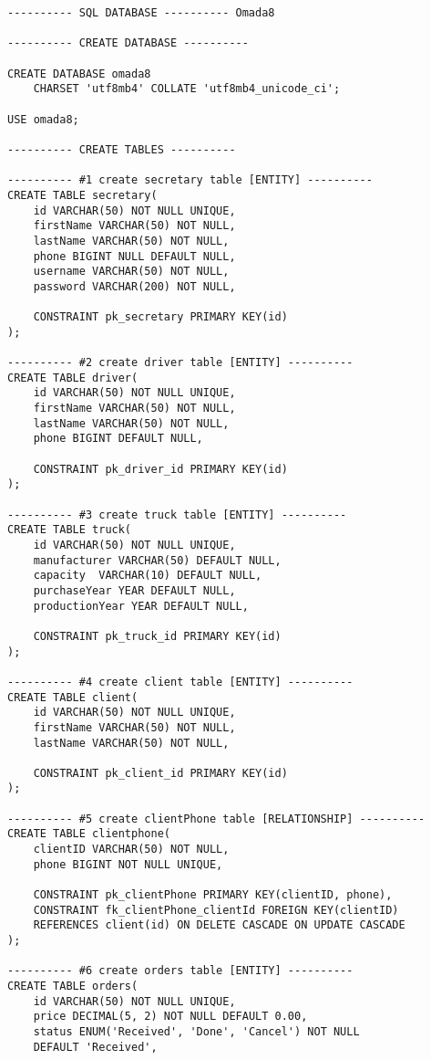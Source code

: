 \begin{lstlisting}
---------- SQL DATABASE ---------- Omada8

---------- CREATE DATABASE ----------

CREATE DATABASE omada8
	CHARSET 'utf8mb4' COLLATE 'utf8mb4_unicode_ci';

USE omada8;

---------- CREATE TABLES ----------

---------- #1 create secretary table [ENTITY] ----------
CREATE TABLE secretary(
    id VARCHAR(50) NOT NULL UNIQUE,
    firstName VARCHAR(50) NOT NULL,
    lastName VARCHAR(50) NOT NULL,
    phone BIGINT NULL DEFAULT NULL,
    username VARCHAR(50) NOT NULL,
    password VARCHAR(200) NOT NULL,
    
    CONSTRAINT pk_secretary PRIMARY KEY(id)
);

---------- #2 create driver table [ENTITY] ----------
CREATE TABLE driver(
    id VARCHAR(50) NOT NULL UNIQUE,
    firstName VARCHAR(50) NOT NULL, 
    lastName VARCHAR(50) NOT NULL,
    phone BIGINT DEFAULT NULL,
    
    CONSTRAINT pk_driver_id PRIMARY KEY(id)
);

---------- #3 create truck table [ENTITY] ----------
CREATE TABLE truck(
    id VARCHAR(50) NOT NULL UNIQUE,
    manufacturer VARCHAR(50) DEFAULT NULL,
    capacity  VARCHAR(10) DEFAULT NULL,
    purchaseYear YEAR DEFAULT NULL,
    productionYear YEAR DEFAULT NULL,
    
    CONSTRAINT pk_truck_id PRIMARY KEY(id)
);

---------- #4 create client table [ENTITY] ----------
CREATE TABLE client(
    id VARCHAR(50) NOT NULL UNIQUE,
    firstName VARCHAR(50) NOT NULL,
    lastName VARCHAR(50) NOT NULL,
    
    CONSTRAINT pk_client_id PRIMARY KEY(id)
);

---------- #5 create clientPhone table [RELATIONSHIP] ----------
CREATE TABLE clientphone(
    clientID VARCHAR(50) NOT NULL,
    phone BIGINT NOT NULL UNIQUE,
    
    CONSTRAINT pk_clientPhone PRIMARY KEY(clientID, phone),
    CONSTRAINT fk_clientPhone_clientId FOREIGN KEY(clientID) 
    REFERENCES client(id) ON DELETE CASCADE ON UPDATE CASCADE
);

---------- #6 create orders table [ENTITY] ----------
CREATE TABLE orders(
    id VARCHAR(50) NOT NULL UNIQUE,
    price DECIMAL(5, 2) NOT NULL DEFAULT 0.00,
    status ENUM('Received', 'Done', 'Cancel') NOT NULL 
    DEFAULT 'Received',
    

\end{lstlisting}
